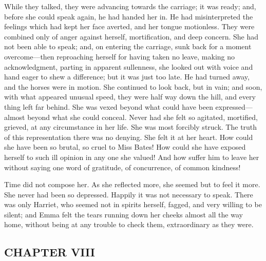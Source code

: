 While they talked, they were advancing towards the carriage; it was ready; and, before she could speak again, he had handed her in. He had misinterpreted the feelings which had kept her face averted, and her tongue motionless. They were combined only of anger against herself, mortification, and deep concern. She had not been able to speak; and, on entering the carriage, sunk back for a moment overcome---then reproaching herself for having taken no leave, making no acknowledgment, parting in apparent sullenness, she looked out with voice and hand eager to shew a difference; but it was just too late. He had turned away, and the horses were in motion. She continued to look back, but in vain; and soon, with what appeared unusual speed, they were half way down the hill, and every thing left far behind. She was vexed beyond what could have been expressed---almost beyond what she could conceal. Never had she felt so agitated, mortified, grieved, at any circumstance in her life. She was most forcibly struck. The truth of this representation there was no denying. She felt it at her heart. How could she have been so brutal, so cruel to Miss Bates! How could she have exposed herself to such ill opinion in any one she valued! And how suffer him to leave her without saying one word of gratitude, of concurrence, of common kindness!

Time did not compose her. As she reflected more, she seemed but to feel it more. She never had been so depressed. Happily it was not necessary to speak. There was only Harriet, who seemed not in spirits herself, fagged, and very willing to be silent; and Emma felt the tears running down her cheeks almost all the way home, without being at any trouble to check them, extraordinary as they were.

\subsection[chapter-viii-2]{\useURL[url46][][][]\from[url46]CHAPTER VIII}

